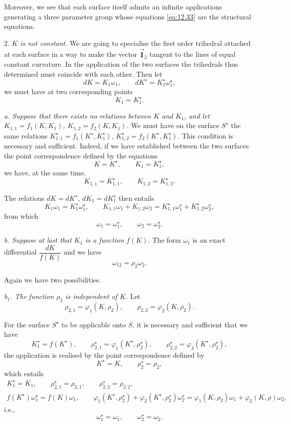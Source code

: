 \documentclass[leqno,11pt]{book}
\makeatletter
\numberwithin{equation}{chapter}
\theoremstyle{shape1}
\theoremstyle{shapesmall}
\let\old@phi\phi
\let\old@varphi\varphi
\let\phi\old@varphi
\let\varphi\old@phi
\newcommand{\str}{^{\star}}
\newcommand{\rvec}[1]{\vec{\mathbf{#1}}}
\newcommand{\ivec}{\rvec{I}}
\newcommand{\somespace}{\vspace{9pt}}
\makeatother
\begin{document}
Moreover, we see that each surface itself admits an infinite applications generating a three parameter group whose equations \eqref{eq:12.33} are the structural equations.

\somespace

2. \emph{$K$ is not constant.}
We are going to specialise the first order trihedral attached at each surface in a way to make the vector $\ivec_{2}$ tangent to the lines of equal constant curvature. In the application of the two surfaces the trihedrals thus determined must coincide with each other. Then let
\[
dK=K_{1}\omega_{1},\qquad dK\str=K\str_{1}\omega\str_{1},
\]
we must have at two corresponding points
\[
K_{1}=K\str_{1}.
\]

\somespace

\emph{a. Suppose that there exists no relations between $K$ and $K_{1}$, and let $K_{1,1}=f_{1}(K,K_{1})$, $K_{1,2}=f_{2}(K,K_{1})$.}
We must have on the surface $S\str$ the same relations $K\str_{1,1}=f_{1}(K\str,K\str_{1})$, $K\str_{1,2}=f_{2}(K\str,K\str_{1})$. This condition is necessary and sufficient. Indeed, if we have established between the two surfaces the point correspondence defined by the equations
\[
K=K\str,\qquad K_{1}=K\str_{1},
\]
we have, at the same time,
\[
K_{1,1}=K\str_{1,1},\qquad K_{1,2}=K\str_{1,2}.
\]

The relations $dK=dK\str$, $dK_{1}=dK\str_{1}$ then entails
\[
K_{1}\omega_{1}=K\str_{1}\omega\str_{1},\qquad K_{1,1}\omega_{1}+K_{1,2}\omega_{2}=K\str_{1,1}\omega_{1}\str+K\str_{1,2}\omega\str_{2},
\]
from which
\[
\omega_{1}=\omega_{1}\str,\qquad\omega_{2}=\omega_{2}\str.
\]

\somespace

\emph{b. Suppose at last that $K_{1}$ is a function $f(K)$.}
The form $\omega_{1}$ is an exact differential $\dfrac{dK}{f(K)}$ and we have
\[
\omega_{12}=\rho_{2}\omega_{2}.
\]

Again we have two possibilities.

\somespace

\emph{b$_{1}$. The function $\rho_{2}$ is independent of $K$.}
Let
\[
\rho_{2,1}=\phi_{1}(K,\rho_{2}),\qquad\rho_{2,2}=\phi_{2}(K,\rho_{2}).
\]

For the surface $S\str$ to be applicable onto $S$, it is necessary and sufficient that we have
\[
K\str_{1}=f(K\str),\qquad\rho\str_{2,1}=\phi_{1}(K\str,\rho\str_{2}),\qquad\rho\str_{2,2}=\phi_{2}(K\str,\rho\str_{2}),
\]
the application is realised by the point correspondence defined by
\[
K\str=K,\qquad \rho\str_{2}=\rho_{2},
\]
which entails
\begin{gather*}
  K\str_{1}=K_{1},\qquad\rho\str_{2,1}=\rho_{2,1},\qquad\rho\str_{2,2}=\rho_{2,2},\\
  f(K\str)\omega\str_{1}=f(K)\omega_{1},\qquad
  \phi_{1}(K\str,\rho\str_{2})+\phi_{2}(K\str,\rho\str_{2})\omega_{2}\str=\phi_{1}(K,\rho_{2})\omega_{1}+\phi_{2}(K,\rho)\omega_{2},
\end{gather*}
i.e.,
\[
\omega\str_{1}=\omega_{1},\qquad\omega\str_{2}=\omega_{2}.
\]
\end{document}
